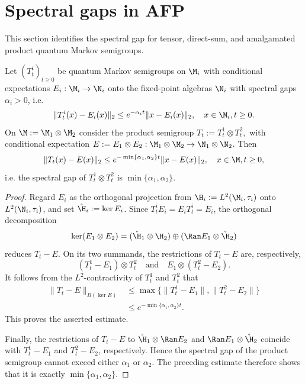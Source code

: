 \documentclass[sn-mathphys-num]{sn-jnl}
\begin{document}
\section{Spectral gaps in AFP}
This section identifies the spectral gap for tensor, direct-sum, and amalgamated product quantum Markov semigroups.
\begin{proposition}\label{prop:Gap-tensor}
Let $(T^i_t)_{t\ge0}$ be quantum Markov semigroups on $\M_i$ with conditional expectations $E_i:\M_i\to\N_i$ onto the fixed-point algebras $\N_i$ with spectral gaps $\alpha_i>0$, i.e.
\[
\|T^i_t(x)-E_i(x)\|_{2}
 \le e^{-\alpha_i t}  \|x-E_i(x)\|_{2},
\quad   x\in\M_i, t\ge0.
\]
On
$\M:=\M_1\otimes\M_2$ consider the product semigroup $T_t
:= T^1_t\otimes T^2_t,$
with conditional expectation $E:=E_1\otimes E_2:\M_1\otimes\M_2\to\N_1\otimes\N_2$.  Then
\[
\|T_t(x)-E(x)\|_{2}
 \le
e^{-\min\{\alpha_1,\alpha_2\}  t}
\|x - E(x)\|_{2},
\quad   x\in\M, t\ge0,
\]
i.e. the spectral gap of $T^1_t\otimes T^2_t$ is $\min\{\alpha_1,\alpha_2\}$.
\end{proposition}
\begin{proof}
Regard $E_i$ as the orthogonal projection from
$\H_i:=L^2(\M_i,\tau_i)$ onto $L^2(\N_i,\tau_i)$, and set
$\mathring\H_i:=\ker E_i$.  Since
$T_t^iE_i=E_iT_t^i=E_i$, the orthogonal decomposition
\[
\ker(E_1\otimes E_2)
=
(\mathring\H_1\otimes\H_2)
\oplus
(\Ran E_1\otimes\mathring\H_2)
\]
reduces $T_t-E$.  On its two summands, the restrictions of $T_t-E$ are,
respectively,
\[
(T_t^1-E_1)\otimes T_t^2
\quad\text{and}\quad
E_1\otimes(T_t^2-E_2).
\]
It follows from the $L^2$-contractivity of $T_t^1$ and $T_t^2$ that
\begin{align*}
\|T_t-E\|_{B(\ker E)}
&\le
\max\bigl\{\|T_t^1-E_1\|,\|T_t^2-E_2\|\bigr\} \\
&\le
e^{-\min\{\alpha_1,\alpha_2\}t}.
\end{align*}
This proves the asserted estimate.

Finally, the restrictions of $T_t-E$ to
$\mathring\H_1\otimes\Ran E_2$ and
$\Ran E_1\otimes\mathring\H_2$ coincide with $T_t^1-E_1$ and
$T_t^2-E_2$, respectively.  Hence the spectral gap of the product semigroup
cannot exceed either $\alpha_1$ or $\alpha_2$.  The preceding estimate therefore
shows that it is exactly $\min\{\alpha_1,\alpha_2\}$.
\end{proof}
\end{document}

